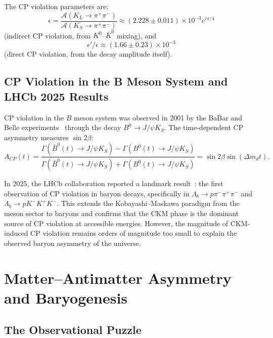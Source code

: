 \documentclass[12pt]{article}
\theoremstyle{definition}
\theoremstyle{remark}
\begin{document}
The CP violation parameters are:
\begin{equation}
\epsilon = \frac{\mathcal{A}(K_L \to \pi^+\pi^-)}{\mathcal{A}(K_S \to \pi^+\pi^-)} \approx (2.228 \pm 0.011) \times 10^{-3} e^{i\pi/4}
\end{equation}
(indirect CP violation, from $K^0$--$\bar{K}^0$ mixing), and
\begin{equation}
\epsilon' / \epsilon \approx (1.66 \pm 0.23) \times 10^{-3}
\end{equation}
(direct CP violation, from the decay amplitude itself).

\subsection{CP Violation in the B Meson System and LHCb 2025 Results}

CP violation in the $B$ meson system was observed in 2001 by the BaBar and Belle
experiments~\cite{BaBar2001,Belle2001} through the decay $B^0 \to J/\psi K_S$.
The time-dependent CP asymmetry measures $\sin 2\beta$:
\begin{equation}
A_{CP}(t) = \frac{\Gamma(\bar{B}^0(t) \to J/\psi K_S) - \Gamma(B^0(t) \to J/\psi K_S)}
{\Gamma(\bar{B}^0(t) \to J/\psi K_S) + \Gamma(B^0(t) \to J/\psi K_S)} = \sin 2\beta \sin(\Delta m_d t).
\end{equation}

In 2025, the LHCb collaboration reported a landmark result~\cite{LHCb2025}: the first
observation of CP violation in baryon decays, specifically in $\Lambda_b \to p\pi^-\pi^+\pi^-$
and $\Lambda_b \to pK^-K^+K^-$. This extends the Kobayashi--Maskawa paradigm from the meson
sector to baryons and confirms that the CKM phase is the dominant source of CP violation
at accessible energies. However, the magnitude of CKM-induced CP violation remains
orders of magnitude too small to explain the observed baryon asymmetry of the universe.

\section{Matter--Antimatter Asymmetry and Baryogenesis}
\label{sec:baryogenesis}

\subsection{The Observational Puzzle}
\end{document}
